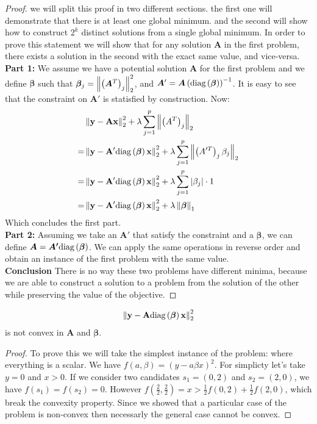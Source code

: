 \begin{proof}
  we will split this proof in two different sections. the first one will
  demonstrate that there is at least one global minimum. and the second
  will show how to construct $2^k$ distinct solutions from a single global
  minimum.
  In order to prove this statement we will show that for any solution $\bm{A}$ in the first problem, there exists a solution in the second with the exact same value, and vice-versa.
  \\ \textbf{Part 1:} We assume we have a potential solution $\bm{A}$ for the first problem and we define $\bm{\beta}$ such that $\bm{\beta}_j = \left\lVert\left(\bm{A}^T\right)_j\right\rVert_2^2$, and $\bm{A}' = \bm{A}\left(\text{diag}\left(\bm{\beta}\right)\right)^{-1}$. It is easy to see that the constraint on $\bm{A}'$ is statisfied by construction. Now:
  \begin{align*}
    & \left\lVert\bf{y} - \bf{A}\bf{x}\right\rVert_2^2 + \lambda \sum_{j=1}^p \left\lVert\left(A^T\right)_j\right\rVert_2 \\
    = &\left\lVert\bf{y} - \bf{A'}\text{diag}\left(\bm{\beta}\right)\bf{x}\right\rVert_2^2 + \lambda \sum_{j=1}^p \left\lVert\left(A'^T\right)_j\beta_j\right\rVert_2 \\
    = &\left\lVert\bf{y} - \bf{A'}\text{diag}\left(\bm{\beta}\right)\bf{x}\right\rVert_2^2 + \lambda \sum_{j=1}^p \left|\beta_j\right| \cdot 1\\
    = &\left\lVert\bf{y} - \bf{A'}\text{diag}\left(\bm{\beta}\right)\bf{x}\right\rVert_2^2 + \lambda \left\lVert\bm{\beta}\right\rVert_1
  \end{align*}
  Which concludes the first part.
  \\ \textbf{Part 2:} Assuming we take an $\bm{A}'$ that satisfy the constraint and a $\bm{\beta}$, we can define $\bm{A} = \bm{A'}\text{diag}\left(\bm{\beta}\right)$. We can apply the same operations in reverse order and obtain an instance of the first problem with the same value.
  \\ \textbf{Conclusion} There is no way these two problems have different minima,
  because we are able to construct a solution to a problem from the solution
  of the other while preserving the value of the objective.
\end{proof}

\begin{proposition}
\label{unconstrained_non_convex}
\begin{equation*}
     \left\lVert\bf{y} - \bf{A}\text{diag}\left(\bm{\beta}\right)\bf{x}\right\rVert_2^2
\end{equation*}
is not convex in $\bm{A}$ and $\bm{\beta}$.
\begin{proof}
  To prove this we will take the simplest instance of the problem: where everything is a scalar. We have $f(a, \beta) = \left(y - a\beta x\right)^2$. For simplicty let's take $y = 0$ and $x > 0$. If we consider two candidates $s_1 = (0, 2)$ and $s_2 = (2, 0)$, we have $f(s_1) = f(s_2) = 0$. However $f(\frac{2}{2}, \frac{2}{2}) = x > \frac{1}{2} f(0, 2) + \frac{1}{2}f(2, 0)$, which break the convexity property. Since we showed that a particular case of the problem is non-convex then necessarly the general case cannot be convex.
\end{proof}
\end{proposition}

